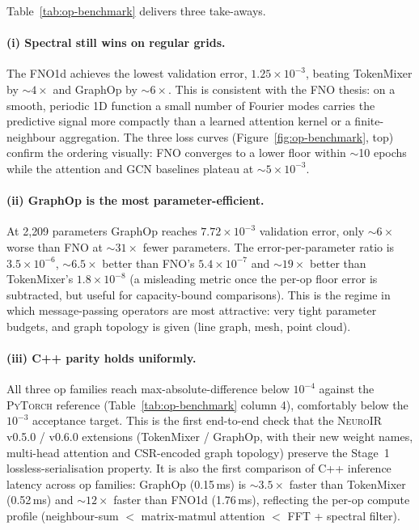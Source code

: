 \documentclass[10pt,twocolumn]{article}
\newcommand{\neuroir}{\textsc{NeuroIR}}
\newcommand{\fno}{\textsc{FNO}}
\newcommand{\py}{\textsc{PyTorch}}
\begin{document}
Table~\ref{tab:op-benchmark} delivers three take-aways.

\paragraph{(i) Spectral still wins on regular grids.}
The \fno{}1d achieves the lowest validation error,
$1.25 \times 10^{-3}$, beating TokenMixer by
$\sim\!4\times$ and GraphOp by $\sim\!6\times$.  This is
consistent with the FNO thesis: on a smooth, periodic 1D
function a small number of Fourier modes carries the
predictive signal more compactly than a learned
attention kernel or a finite-neighbour aggregation.  The
three loss curves (Figure~\ref{fig:op-benchmark}, top) confirm
the ordering visually: FNO converges to a lower
floor within $\sim$10 epochs while the attention and
GCN baselines plateau at $\sim\!5 \times 10^{-3}$.

\paragraph{(ii) GraphOp is the most parameter-efficient.}
At 2{,}209 parameters GraphOp reaches
$7.72 \times 10^{-3}$ validation error, only $\sim\!6\times$
worse than FNO at $\sim\!31\times$ fewer parameters.  The
error-per-parameter ratio is
$3.5 \times 10^{-6}$, $\sim\!6.5\times$ better than FNO's
$5.4 \times 10^{-7}$ and $\sim\!19\times$ better than
TokenMixer's $1.8 \times 10^{-8}$ (a misleading metric
once the per-op floor error is subtracted, but useful for
capacity-bound comparisons).  This is the regime in which
message-passing operators are most attractive: very tight
parameter budgets, and graph topology is given (line graph,
mesh, point cloud).

\paragraph{(iii) C{++} parity holds uniformly.}
All three op families reach max-absolute-difference below
$10^{-4}$ against the \py{} reference
(Table~\ref{tab:op-benchmark} column 4), comfortably below
the $10^{-3}$ acceptance target.  This is the first
end-to-end check that the \neuroir{} v0.5.0 / v0.6.0
extensions (TokenMixer / GraphOp, with their new weight
names, multi-head attention and CSR-encoded graph
topology) preserve the Stage~1 lossless-serialisation
property.  It is also the first comparison of C{++}
inference latency across op families: GraphOp
(0.15\,ms) is $\sim\!3.5\times$ faster than TokenMixer
(0.52\,ms) and $\sim\!12\times$ faster than \fno{}1d
(1.76\,ms), reflecting the per-op compute profile
(neighbour-sum $<$ matrix-matmul attention $<$ FFT +
spectral filter).
\end{document}

